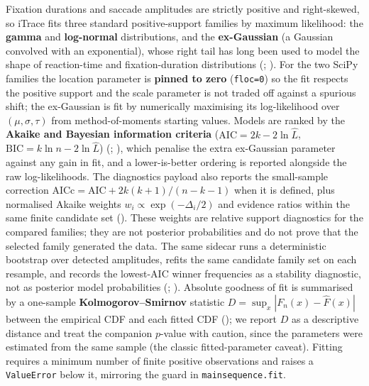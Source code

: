\documentclass[
]{article}
\begin{document}
Fixation durations and saccade amplitudes are strictly positive and
right-skewed, so iTrace fits three standard positive-support families by
maximum likelihood: the \textbf{gamma} and \textbf{log-normal}
distributions, and the \textbf{ex-Gaussian} (a Gaussian convolved with
an exponential), whose right tail has long been used to model the shape
of reaction-time and fixation-duration distributions
(;
). For the two SciPy families
the location parameter is \textbf{pinned to zero} (\texttt{floc=0}) so
the fit respects the positive support and the scale parameter is not
traded off against a spurious shift; the ex-Gaussian is fit by
numerically maximising its log-likelihood over \((\mu, \sigma, \tau)\)
from method-of-moments starting values. Models are ranked by the
\textbf{Akaike and Bayesian information criteria}
(\(\mathrm{AIC} = 2k - 2\ln\hat{L}\),
\(\mathrm{BIC} = k\ln n - 2\ln\hat{L}\))
(;
), which penalise the
extra ex-Gaussian parameter against any gain in fit, and a
lower-is-better ordering is reported alongside the raw log-likelihoods.
The diagnostics payload also reports the small-sample correction
\(\mathrm{AICc} = \mathrm{AIC} + 2k(k+1)/(n-k-1)\) when it is defined,
plus normalised Akaike weights \(w_i \propto \exp(-\Delta_i/2)\) and
evidence ratios within the same finite candidate set
(). These
weights are relative support diagnostics for the compared families; they
are not posterior probabilities and do not prove that the selected
family generated the data. The same sidecar runs a deterministic
bootstrap over detected amplitudes, refits the same candidate family set
on each resample, and records the lowest-AIC winner frequencies as a
stability diagnostic, not as posterior model probabilities
(;
). Absolute
goodness of fit is summarised by a one-sample
\textbf{Kolmogorov--Smirnov} statistic
\(D = \sup_x |F_n(x) - \hat{F}(x)|\) between the empirical CDF and each
fitted CDF (); we report
\(D\) as a descriptive distance and treat the companion \(p\)-value with
caution, since the parameters were estimated from the same sample (the
classic fitted-parameter caveat). Fitting requires a minimum number of
finite positive observations and raises a \texttt{ValueError} below it,
mirroring the guard in \texttt{mainsequence.fit}.
\end{document}
